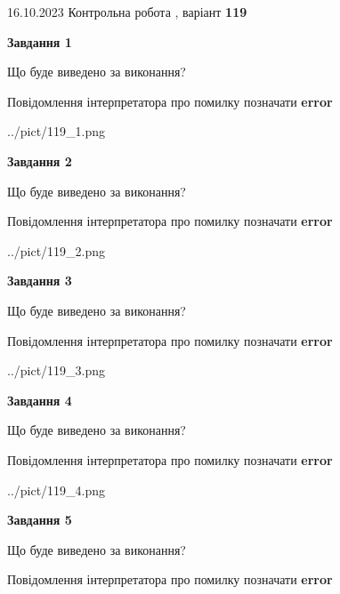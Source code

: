 \documentclass[12pt, ukrainian]{article}
\begin{document}
{\Large{16.10.2023 Контрольна робота , варіант  \No \textbf { 119 }\par}}
{
\begin {large}
{\begin {center}\textbf{Завдання 1}\end {center}}\par
Що буде виведено за виконання? \par
Повідомлення інтерпретатора про помилку позначати \textbf{error}

\begin{center}
	{../pict/119_1.png}
\end{center}
\newpage

{\begin {center}\textbf{Завдання 2}\end {center}}\par
Що буде виведено за виконання? \par
Повідомлення інтерпретатора про помилку позначати \textbf{error}

\begin{center}
	{../pict/119_2.png}
\end{center}
\newpage

{\begin {center}\textbf{Завдання 3}\end {center}}\par
Що буде виведено за виконання? \par
Повідомлення інтерпретатора про помилку позначати \textbf{error}

\begin{center}
	{../pict/119_3.png}
\end{center}
\newpage

{\begin {center}\textbf{Завдання 4}\end {center}}\par
Що буде виведено за виконання? \par
Повідомлення інтерпретатора про помилку позначати \textbf{error}

\begin{center}
	{../pict/119_4.png}
\end{center}
\newpage

{\begin {center}\textbf{Завдання 5}\end {center}}\par
Що буде виведено за виконання? \par
Повідомлення інтерпретатора про помилку позначати \textbf{error}


\end{large}}
\end{document}
